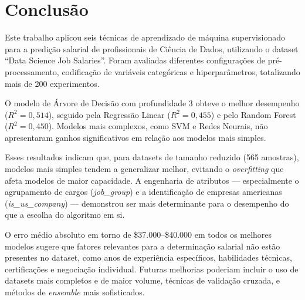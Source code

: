 \documentclass[12pt]{article}
\begin{document}
\section{Conclusão}

Este trabalho aplicou seis técnicas de aprendizado de máquina supervisionado para a predição salarial de profissionais de Ciência de Dados, utilizando o dataset ``Data Science Job Salaries''. Foram avaliadas diferentes configurações de pré-processamento, codificação de variáveis categóricas e hiperparâmetros, totalizando mais de 200 experimentos.

O modelo de Árvore de Decisão com profundidade 3 obteve o melhor desempenho ($R^2 = 0{,}514$), seguido pela Regressão Linear ($R^2 = 0{,}455$) e pelo Random Forest ($R^2 = 0{,}450$). Modelos mais complexos, como SVM e Redes Neurais, não apresentaram ganhos significativos em relação aos modelos mais simples.

Esses resultados indicam que, para datasets de tamanho reduzido (565 amostras), modelos mais simples tendem a generalizar melhor, evitando o \textit{overfitting} que afeta modelos de maior capacidade. A engenharia de atributos --- especialmente o agrupamento de cargos (\textit{job\_group}) e a identificação de empresas americanas (\textit{is\_us\_company}) --- demonstrou ser mais determinante para o desempenho do que a escolha do algoritmo em si.

O erro médio absoluto em torno de \$37.000--\$40.000 em todos os melhores modelos sugere que fatores relevantes para a determinação salarial não estão presentes no dataset, como anos de experiência específicos, habilidades técnicas, certificações e negociação individual. Futuras melhorias poderiam incluir o uso de datasets mais completos e de maior volume, técnicas de validação cruzada, e métodos de \textit{ensemble} mais sofisticados.



\end{document}
